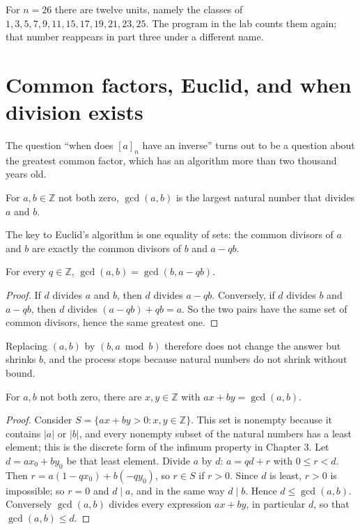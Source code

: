 For $n=26$ there are twelve units, namely the classes of $1,3,5,7,9,11,15,17,19,21,23,25$. The
program in the lab counts them again; that number reappears in part three under a different name.

\section{Common factors, Euclid, and when division exists}

The question ``when does $[a]_n$ have an inverse'' turns out to be a question about the greatest
common factor, which has an algorithm more than two thousand years old.

\begin{definisi}
For $a,b\in\mathbb{Z}$ not both zero, $\gcd(a,b)$ is the largest natural number that divides $a$ and
$b$.
\end{definisi}

The key to Euclid's algorithm is one equality of sets: the common divisors of $a$ and $b$ are exactly
the common divisors of $b$ and $a-qb$.

\begin{lemma}
For every $q\in\mathbb{Z}$, $\gcd(a,b)=\gcd(b,a-qb)$.
\end{lemma}

\begin{proof}
If $d$ divides $a$ and $b$, then $d$ divides $a-qb$. Conversely, if $d$ divides $b$ and $a-qb$, then
$d$ divides $(a-qb)+qb=a$. So the two pairs have the same set of common divisors, hence the same
greatest one.
\end{proof}

Replacing $(a,b)$ by $(b,a\bmod b)$ therefore does not change the answer but shrinks $b$, and the
process stops because natural numbers do not shrink without bound.

\begin{teorema}[Bezout]
For $a,b$ not both zero, there are $x,y\in\mathbb{Z}$ with $ax+by=\gcd(a,b)$.
\end{teorema}

\begin{proof}
Consider $S=\{ax+by>0: x,y\in\mathbb{Z}\}$. This set is nonempty because it contains $|a|$ or $|b|$,
and every nonempty subset of the natural numbers has a least element; this is the discrete form of
the infimum property in Chapter 3. Let $d=ax_0+by_0$ be that least element. Divide $a$ by $d$:
$a=qd+r$ with $0\le r<d$. Then $r=a(1-qx_0)+b(-qy_0)$, so $r\in S$ if $r>0$. Since $d$ is least,
$r>0$ is impossible; so $r=0$ and $d\mid a$, and in the same way $d\mid b$. Hence $d\le\gcd(a,b)$.
Conversely $\gcd(a,b)$ divides every expression $ax+by$, in particular $d$, so that
$\gcd(a,b)\le d$.
\end{proof}

